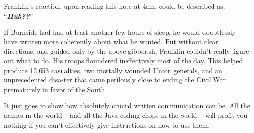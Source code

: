 \begin{center}
\large
{}
\end{center}

\normalsize

Franklin's reaction, upon reading this note at 4am, could be described as:
``\textit{\textbf{Huh??}}''

If Burnside had had at least another few hours of sleep, he would doubtlessly
have written more coherently about what he wanted. But without clear
directions, and guided only by the above gibberish, Franklin couldn't really
figure out what to do. His troops floundered ineffectively most of the day.
This helped produce 12,653 casualties, two mortally wounded Union generals,
and an unprecedented disaster that came perilously close to ending the Civil
War prematurely in favor of the South.

It just goes to show how absolutely crucial written communication can be. All
the armies in the world -- and all the Java coding chops in the world -- will
profit you nothing if you can't effectively give instructions on how to use
them.
